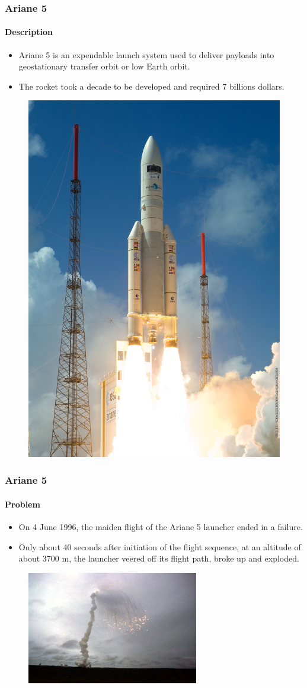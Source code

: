 \begin{frame}[hasprev=false,hasnext=true]
\label{example:ariane-5}
\frametitle{Ariane 5}
\framesubtitle{Description}

\begin{itemize}
	\item Ariane 5 is an expendable launch system used to deliver payloads into
	geostationary transfer orbit or low Earth orbit.

	\item The rocket took a decade to be developed and required 7 billions
	dollars.
\end{itemize}

\begin{figure}
	\centering
	\includegraphics[width=.4\textwidth]{aux/examples/ariane-5/ariane-5}
\end{figure}
\end{frame}


\begin{frame}[hasprev=true,hasnext=true]
\frametitle{Ariane 5}
\framesubtitle{Problem}

\begin{itemize}
	\item On 4 June 1996, the maiden flight of the Ariane 5 launcher ended in a
	failure.

	\item Only about 40 seconds after initiation of the flight sequence, at an
	altitude of about 3700 m, the launcher veered off its flight path, broke up
	and exploded.
\end{itemize}

\begin{figure}
	\centering
	\includegraphics[width=7.5cm]{aux/examples/ariane-5/ariane-5-self-destruction}
\end{figure}
\end{frame}


